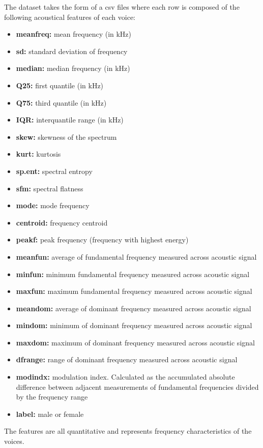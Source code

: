 The dataset takes the form of a csv files where each row is composed of the following acoustical features of each voice:
\begin{itemize}
	\item \textbf{meanfreq:} mean frequency (in kHz)
	\item \textbf{sd:} standard deviation of frequency
	\item \textbf{median:} median frequency (in kHz)
	\item \textbf{Q25:} first quantile (in kHz)
	\item \textbf{Q75:} third quantile (in kHz)
	\item \textbf{IQR:} interquantile range (in kHz)
	\item \textbf{skew:} skewness of the spectrum
	\item \textbf{kurt:} kurtosis
	\item \textbf{sp.ent:} spectral entropy
	\item \textbf{sfm:} spectral flatness
	\item \textbf{mode:} mode frequency
	\item \textbf{centroid:} frequency centroid 
	\item \textbf{peakf:} peak frequency (frequency with highest energy)
	\item \textbf{meanfun:} average of fundamental frequency measured across acoustic signal
	\item \textbf{minfun:} minimum fundamental frequency measured across acoustic signal
	\item \textbf{maxfun:} maximum fundamental frequency measured across acoustic signal
	\item \textbf{meandom:} average of dominant frequency measured across acoustic signal
	\item \textbf{mindom:} minimum of dominant frequency measured across acoustic signal
	\item \textbf{maxdom:} maximum of dominant frequency measured across acoustic signal
	\item \textbf{dfrange:} range of dominant frequency measured across acoustic signal
	\item \textbf{modindx:} modulation index. Calculated as the accumulated absolute difference between adjacent measurements of fundamental frequencies divided by the frequency range
	\item \textbf{label:} male or female
\end{itemize}

The features are all quantitative and represents frequency characteristics of the voices.
